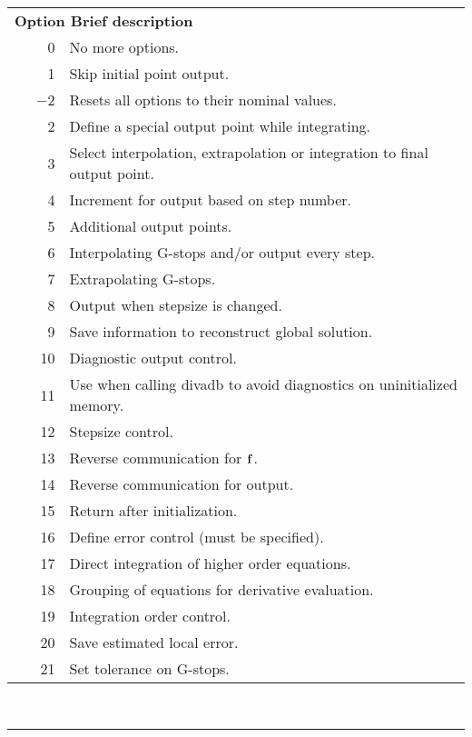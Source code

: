 \documentclass[twoside]{MATH77}
\begin{document}
\label{OptBrief}
\hspace{-.25in}\begin{tabular}{@{}rp{2.9in}}
 \multicolumn{2}{l}{\bf Option \hspace{.4in} Brief description}\\
  0 & No more options.\\
  1 & Skip initial point output.\\
 \ \ \ \bf $-2$ & Resets all options to their nominal values.\\
  2 & Define a special output point while integrating.\\
  3 & Select interpolation, extrapolation or integration to final output point.\\
  4 & Increment for output based on step number.\\
  5 & Additional output points.\\
  6 & Interpolating G-stops and/or output every step.\\
  7 & Extrapolating G-stops.\\
  8 & Output when stepsize is changed.\\
  9 & Save information to reconstruct global solution.\\
  10 & Diagnostic output control.\\
  11 & Use when calling divadb to avoid diagnostics on uninitialized memory.\\
  12 & Stepsize control.\\
  13 & Reverse communication for ${\bf f}$.\\
  14 & Reverse communication for output.\\
  15 & Return after initialization.\\
  16 & Define error control (must be specified).\\
  17 & Direct integration of higher order equations.\\
  18 & Grouping of equations for derivative evaluation.\\
  19 & Integration order control.\\
  20 & Save estimated local error.\\
  21 & Set tolerance on G-stops.
\end{tabular}\\
\hrule \vspace{5pt}
\end{document}
